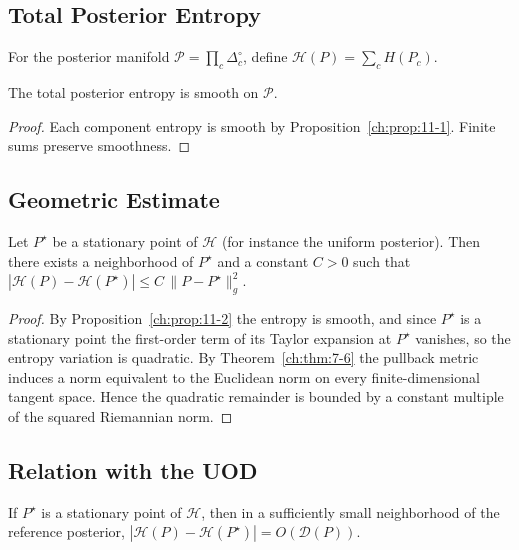 \subsection{Total Posterior Entropy}\label{ch:sec:total-posterior-entropy}

For the posterior manifold $\mathcal P=\prod_c\Delta_c^\circ$,
define $\mathcal H(P)=\sum_c H(P_c)$.

\begin{proposition}
\label{ch:prop:11-2}
The total posterior entropy is smooth on $\mathcal P$.
\end{proposition}

\begin{proof}
Each component entropy is smooth by Proposition~\ref{ch:prop:11-1}.
Finite sums preserve smoothness.\end{proof}

\subsection{Geometric Estimate}\label{ch:sec:geometric-estimate}

\begin{theorem}
\label{ch:thm:11-3}
Let $P^\star$ be a stationary point of $\mathcal H$ (for instance the uniform
posterior).  Then there exists a neighborhood of $P^\star$ and a constant $C>0$ such that
$|\mathcal H(P)-\mathcal H(P^\star)|\le C\,\|P-P^\star\|_g^2$.
\end{theorem}

\begin{proof}
By Proposition~\ref{ch:prop:11-2} the entropy is smooth, and since $P^\star$ is a
stationary point the first-order term of its Taylor expansion at $P^\star$ vanishes,
so the entropy variation is quadratic.
By Theorem~\ref{ch:thm:7-6} the pullback metric induces a norm equivalent to the
Euclidean norm on every finite-dimensional tangent space.
Hence the quadratic remainder is bounded by a constant multiple of the
squared Riemannian norm.\end{proof}

\subsection{Relation with the UOD}\label{ch:sec:relation-with-the-uod}

\begin{corollary}
\label{ch:cor:11-4}
If $P^\star$ is a stationary point of $\mathcal H$, then in a sufficiently small
neighborhood of the reference posterior,
$|\mathcal H(P)-\mathcal H(P^\star)| = O(\mathcal D(P))$.
\end{corollary}

